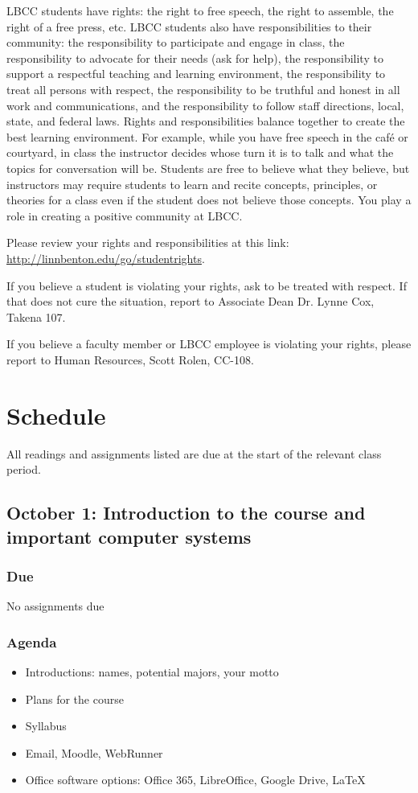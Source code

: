 \documentclass[12pt,article,oneside]{memoir}
\begin{document}
LBCC students have rights: the right to free speech, the right to assemble, the right of a free press, etc. LBCC students also have responsibilities to their community: the responsibility to participate and engage in class, the responsibility to advocate for their needs (ask for help), the responsibility to support a respectful teaching and learning environment, the responsibility to treat all persons with respect, the responsibility to be truthful and honest in all work and communications, and the responsibility to follow staff directions, local, state, and federal laws. Rights and responsibilities balance together to create the best learning environment. For example, while you have free speech in the caf\'{e} or courtyard, in class the instructor decides whose turn it is to talk and what the topics for conversation will be. Students are free to believe what they believe, but instructors may require students to learn and recite concepts, principles, or theories for a class even if the student does not believe those concepts. You play a role in creating a positive community at LBCC. 

Please review your rights and responsibilities at this link: \url{http://linnbenton.edu/go/studentrights}.

If you believe a student is violating your rights, ask to be treated with respect. If that does not cure the situation, report to Associate Dean Dr. Lynne Cox, Takena 107.

If you believe a faculty member or LBCC employee is violating your rights, please report to Human Resources, Scott Rolen, CC-108.

\newpage

\section{Schedule}

All readings and assignments listed are due at the start of the relevant class period.

\subsection{October 1: Introduction to the course and important computer systems}

\subsubsection{Due}
No assignments due

\subsubsection{Agenda}
\begin{itemize}
 \item Introductions: names, potential majors, your motto
 \item Plans for the course
 \item Syllabus
 \item Email, Moodle, WebRunner
 \item Office software options: Office 365, LibreOffice, Google Drive, \LaTeX
\end{itemize}
\end{document}
